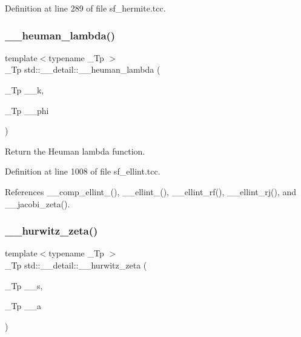 Definition at line 289 of file sf\+\_\+hermite.\+tcc.

\mbox{\label{namespacestd_1_1____detail_a90938823a16cabc06031ebf209066a94}} 
\subsubsection{\texorpdfstring{\+\_\+\+\_\+heuman\+\_\+lambda()}{\_\_heuman\_lambda()}}
{\footnotesize\ttfamily template$<$typename \+\_\+\+Tp $>$ \\
\+\_\+\+Tp std\+::\+\_\+\+\_\+detail\+::\+\_\+\+\_\+heuman\+\_\+lambda (\begin{DoxyParamCaption}\item[{\+\_\+\+Tp}]{\+\_\+\+\_\+k,  }\item[{\+\_\+\+Tp}]{\+\_\+\+\_\+phi }\end{DoxyParamCaption})}

Return the Heuman lambda function. 

Definition at line 1008 of file sf\+\_\+ellint.\+tcc.



References \+\_\+\+\_\+comp\+\_\+ellint\+\_(), \+\_\+\+\_\+ellint\+\_(), \+\_\+\+\_\+ellint\+\_\+rf(), \+\_\+\+\_\+ellint\+\_\+rj(), and \+\_\+\+\_\+jacobi\+\_\+zeta().

\mbox{\label{namespacestd_1_1____detail_a63aafed798ada71b2cc58e84a6652169}} 
\subsubsection{\texorpdfstring{\+\_\+\+\_\+hurwitz\+\_\+zeta()}{\_\_hurwitz\_zeta()}}
{\footnotesize\ttfamily template$<$typename \+\_\+\+Tp $>$ \\
\+\_\+\+Tp std\+::\+\_\+\+\_\+detail\+::\+\_\+\+\_\+hurwitz\+\_\+zeta (\begin{DoxyParamCaption}\item[{\+\_\+\+Tp}]{\+\_\+\+\_\+s,  }\item[{\+\_\+\+Tp}]{\+\_\+\+\_\+a }\end{DoxyParamCaption})}



